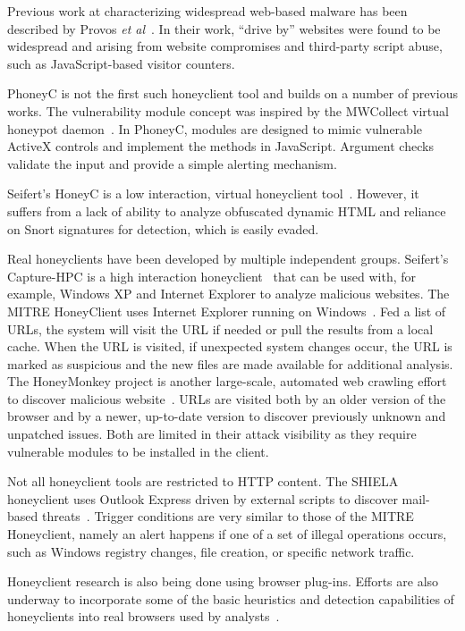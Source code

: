 \documentclass[10pt,twocolumn]{article}
\begin{document}
Previous work at characterizing widespread web-based malware has been described by Provos {\it et al}~\cite{provos:gba}. In their work, ``drive by'' websites were found to be widespread and arising from website compromises and third-party script abuse, such as JavaScript-based visitor counters.

PhoneyC is not the first such honeyclient tool and builds on a number of previous works. The vulnerability module concept was inspired by the MWCollect virtual honeypot daemon~\cite{freiling2005bte}. In PhoneyC, modules are designed to mimic vulnerable ActiveX controls and implement the methods in JavaScript. Argument checks validate the input and provide a simple alerting mechanism. 

Seifert's HoneyC is a low interaction, virtual honeyclient tool~\cite{seifert2006hli}. However, it suffers from a lack of ability to analyze obfuscated dynamic HTML and reliance on Snort signatures for detection, which is easily evaded.

Real honeyclients have been developed by multiple independent groups. Seifert's Capture-HPC is a high interaction honeyclient~\cite{mara:chc} that can be used with, for example, Windows XP and Internet Explorer to analyze malicious websites. The MITRE HoneyClient uses Internet Explorer running on Windows~\cite{wang2005uhd}. Fed a list of URLs, the system will visit the URL if needed or pull the results from a local cache. When the URL is visited, if unexpected system changes occur, the URL is marked as suspicious and the new files are made available for additional analysis. The HoneyMonkey project is another large-scale, automated web crawling effort to discover malicious website~\cite{wang2006awp}. URLs are visited both by an older version of the browser and by a newer, up-to-date version to discover previously unknown and unpatched issues. Both are limited in their attack visibility as they require vulnerable modules to be installed in the client.

Not all honeyclient tools are restricted to HTTP content. The SHIELA honeyclient uses Outlook Express driven by external scripts to discover mail-based threats~\cite{rocaspana:sch}. Trigger conditions are very similar to those of the MITRE Honeyclient, namely an alert happens if one of a set of illegal operations occurs, such as Windows registry changes, file creation, or specific network traffic. 

Honeyclient research is also being done using browser plug-ins. Efforts are also underway to incorporate some of the basic heuristics and detection capabilities of honeyclients into real browsers used by analysts~\cite{hallaraker2005dmj}. 
\end{document}

